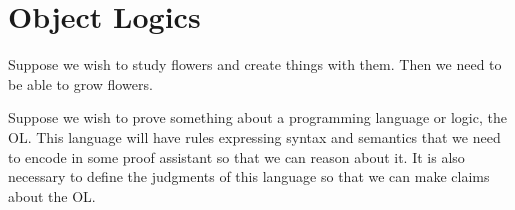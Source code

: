 \section{Object Logics}
\label{sec:hybridol}

\begin{sidestory}
Suppose we wish to study flowers and create things with them. Then we need to be able to grow flowers.
\end{sidestory}

Suppose we wish to prove something about a programming language or logic, the OL. This language will have rules expressing syntax and semantics that we need to encode in some proof assistant so that we can reason about it. It is also necessary to define the judgments of this language so that we can make claims about the OL.

